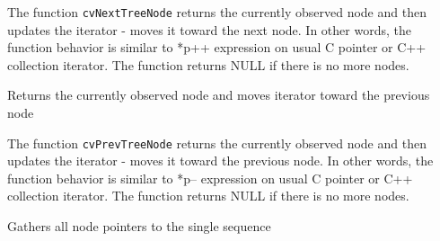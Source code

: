 
\begin{description}
\end{description}


The function \texttt{cvNextTreeNode} returns the currently observed node and then updates the iterator - moves it toward the next node. In other words, the function behavior is similar to *p++ expression on usual C pointer or C++ collection iterator. The function returns NULL if there is no more nodes.


\label{PrevTreeNode}

Returns the currently observed node and moves iterator toward the previous node


\begin{description}
\end{description}


The function \texttt{cvPrevTreeNode} returns the currently observed node and then updates the iterator - moves it toward the previous node. In other words, the function behavior is similar to *p-- expression on usual C pointer or C++ collection iterator. The function returns NULL if there is no more nodes.


\label{TreeToNodeSeq}

Gathers all node pointers to the single sequence


\begin{description}
\end{description}


